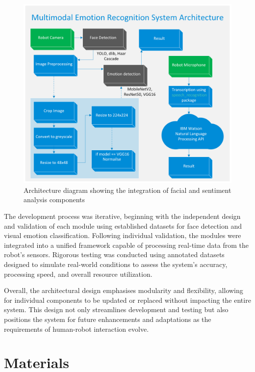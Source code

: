 \begin{figure}[!htb]
    \centering{}
    \includegraphics[scale=0.35]{m+m_images/ArchitectureDiagram.png}
    \caption{Architecture diagram showing the integration of facial and sentiment analysis components}
    \label{figure:architecturediagram}
\end{figure}

The development process was iterative, beginning with the independent design and validation of each module using established datasets for face detection and visual emotion classification. Following individual validation, the modules were integrated into a unified framework capable of processing real-time data from the robot's sensors. Rigorous testing was conducted using annotated datasets designed to simulate real-world conditions to assess the system's accuracy, processing speed, and overall resource utilization.

Overall, the architectural design emphasises modularity and flexibility, allowing for individual components to be updated or replaced without impacting the entire system. This design not only streamlines development and testing but also positions the system for future enhancements and adaptations as the requirements of human-robot interaction evolve.

\section{Materials}

